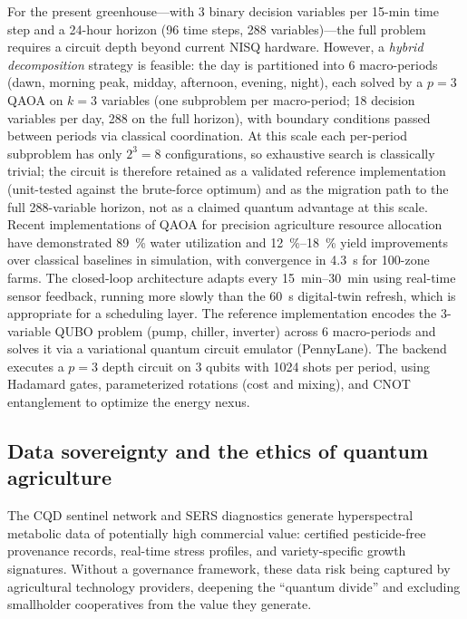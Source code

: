 \documentclass[11pt,a4paper]{article}
\begin{document}
For the present greenhouse---with 3 binary decision variables per 15-min time step and a 24-hour horizon (96 time steps, 288 variables)---the full problem requires a circuit depth beyond current NISQ hardware. However, a \textit{hybrid decomposition} strategy is feasible: the day is partitioned into 6 macro-periods (dawn, morning peak, midday, afternoon, evening, night), each solved by a $p=3$ QAOA on $k=3$ variables (one subproblem per macro-period; 18 decision variables per day, 288 on the full horizon), with boundary conditions passed between periods via classical coordination. At this scale each per-period subproblem has only $2^3 = 8$ configurations, so exhaustive search is classically trivial; the circuit is therefore retained as a validated reference implementation (unit-tested against the brute-force optimum) and as the migration path to the full 288-variable horizon, not as a claimed quantum advantage at this scale. Recent implementations of QAOA for precision agriculture resource allocation~\cite{AlSagri2025} have demonstrated \qty{89}{\percent} water utilization and \qtyrange{12}{18}{\percent} yield improvements over classical baselines in simulation, with convergence in \qty{4.3}{\s} for 100-zone farms. The closed-loop architecture adapts every \qtyrange{15}{30}{\minute} using real-time sensor feedback, running more slowly than the \qty{60}{\second} digital-twin refresh, which is appropriate for a scheduling layer. The reference implementation encodes the 3-variable QUBO problem (pump, chiller, inverter) across 6 macro-periods and solves it via a variational quantum circuit emulator (PennyLane). The backend executes a $p=3$ depth circuit on 3 qubits with 1024 shots per period, using Hadamard gates, parameterized rotations (cost and mixing), and CNOT entanglement to optimize the energy nexus.

\subsection{Data sovereignty and the ethics of quantum agriculture}
\label{SI-sec:datasovereignty}

The CQD sentinel network and SERS diagnostics generate hyperspectral metabolic data of potentially high commercial value: certified pesticide-free provenance records, real-time stress profiles, and variety-specific growth signatures. Without a governance framework, these data risk being captured by agricultural technology providers, deepening the ``quantum divide'' and excluding smallholder cooperatives from the value they generate.
\end{document}
